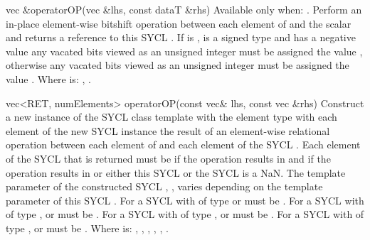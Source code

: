   \addRow
  {vec \&operatorOP(vec \&lhs, const dataT \&rhs)}
  {
    Available only when: .
    \newline
    Perform an in-place element-wise  bitshift operation between each element of   and the  scalar and returns a reference to this SYCL . If  is \codeinline{>>\=},  is a signed type and   has a negative value any vacated bits viewed as an unsigned integer must be assigned the value , otherwise any vacated bits viewed as an unsigned integer must be assigned the value .
    \newline \newline
    Where  is: \codeinline{<<\=}, \codeinline{>>\=}.
  }

  \addRow
    {vec<RET, numElements> operatorOP(const vec\& lhs, const vec \&rhs)}
    {
      Construct a new instance of the SYCL  class template with the element type  with each element of the new SYCL  instance the result of an element-wise  relational operation between each element of   and each element of the  SYCL . Each element of the SYCL  that is returned must be  if the operation results in  and  if the operation results in  or either this SYCL  or the  SYCL  is a NaN.
      \newline \newline
      The  template parameter of the constructed SYCL , , varies depending on the  template parameter of this SYCL . For a SYCL  with  of type  or   must be . For a SYCL  with  of type ,  or   must be . For a SYCL  with  of type ,  or   must be . For a SYCL  with  of type ,  or   must be .
      \newline \newline
      Where  is: \codeinline{==}, \codeinline{!=}, \codeinline{<}, \codeinline{>}, \codeinline{<=}, \codeinline{>=}.
    }
    
